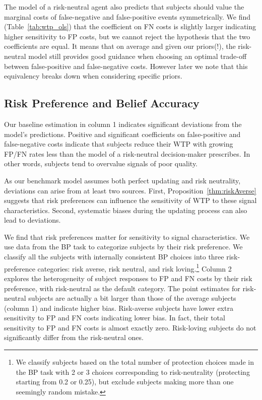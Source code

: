 \documentclass[12pt,a4paper]{article}
\begin{document}
		


The model of a risk-neutral agent also predicts that subjects should value the marginal costs of false-negative and false-positive events symmetrically. We find (Table~\ref{tab:wtp_ols}) that the coefficient on FN costs is slightly larger indicating higher sensitivity to FP costs, but we cannot reject the hypothesis that the two coefficients are equal. It means that on average and given our priors(!), the risk-neutral model still provides good guidance when choosing an optimal trade-off between false-positive and false-negative costs. However later we note that this equivalency breaks down when considering specific priors. 

\subsection{Risk Preference and Belief Accuracy}

Our baseline estimation in column 1 indicates significant deviations from the model's predictions. Positive and significant coefficients on false-positive and false-negative costs indicate that subjects reduce their WTP with growing FP/FN rates less than the model of a risk-neutral decision-maker prescribes. In other words, subjects tend to overvalue signals of poor quality.

As our benchmark model assumes both perfect updating and risk neutrality, deviations can arise from at least two sources. First, Proposition~\ref{thm:riskAverse} suggests that risk preferences can influence the sensitivity of WTP to these signal characteristics. Second, systematic biases during the updating process can also lead to deviations. 

We find that risk preferences matter for sensitivity to signal characteristics. We use data from the BP task to categorize subjects by their risk preference. We classify all the subjects with internally consistent BP choices into three risk-preference categories: risk averse, risk neutral, and risk loving.\footnote{We classify subjects based on the total number of protection choices made in the BP task with 2 or 3 choices corresponding to risk-neutrality (protecting starting from 0.2 or 0.25), but exclude subjects making more than one seemingly random mistake.} Column 2 explores the heterogeneity of subject responses to FP and FN costs by their risk preference, with risk-neutral as the default category. The point estimates for risk-neutral subjects are actually a bit larger than those of the average subjects (column 1) and indicate higher bias. Risk-averse subjects have lower extra sensitivity to FP and FN costs indicating lower bias. In fact, their total sensitivity to FP and FN costs is almost exactly zero. Risk-loving subjects do not significantly differ from the risk-neutral ones. 
\end{document}
